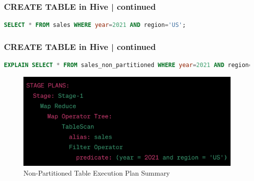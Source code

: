 \begin{frame}[fragile]
\frametitle{CREATE TABLE in Hive | continued}
\begin{tcolorbox}[colback=white,colframe=black,title= Part 5: Table Partitions]
\small
\begin{lstlisting}[caption={SQL},language=SQL]
SELECT * FROM sales WHERE year=2021 AND region='US';
\end{lstlisting}
\vspace{-0.5cm}
  \begin{table}[h!]
	\centering
\caption{Comparison: Non-Partitioned vs Partitioned Table.}
\end{table}

\end{tcolorbox}

\end{frame}
\begin{frame}[fragile]
	\frametitle{CREATE TABLE in Hive | continued}
	\vspace{-0.6cm}
	\begin{tcolorbox}[colback=white,colframe=black,title= Part 5: Table Partitions]
	\small
	\vspace{-0.3cm}
\begin{lstlisting}[caption={Explain Plan Command for Non-Partitioned Table },language=SQL]
EXPLAIN SELECT * FROM sales_non_partitioned WHERE year=2021 AND region='US';
\end{lstlisting}
	\vspace{-0.5cm}
	\begin{figure}
		\includegraphics[width=.7\textwidth,height=\textheight,keepaspectratio]{./Figures/chapter-03/non_partitioned_explain.png}
		\caption{Non-Partitioned Table Execution Plan Summary}	
	\end{figure}
\end{tcolorbox}
	
\end{frame}
